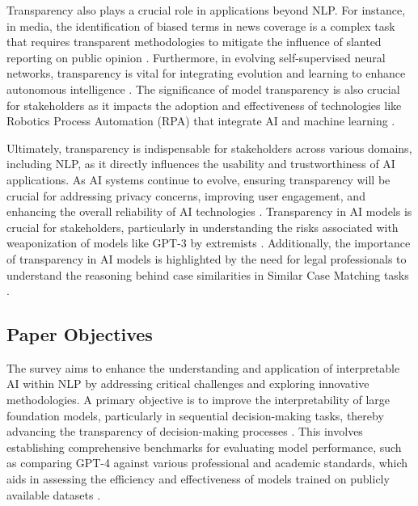 Transparency also plays a crucial role in applications beyond NLP. For instance, in media, the identification of biased terms in news coverage is a complex task that requires transparent methodologies to mitigate the influence of slanted reporting on public opinion \cite{spinde2021identificationbiasedtermsnews}. Furthermore, in evolving self-supervised neural networks, transparency is vital for integrating evolution and learning to enhance autonomous intelligence \cite{le2019evolvingselfsupervisedneuralnetworks}. The significance of model transparency is also crucial for stakeholders as it impacts the adoption and effectiveness of technologies like Robotics Process Automation (RPA) that integrate AI and machine learning \cite{pandy2024advancementsroboticsprocessautomation}.



Ultimately, transparency is indispensable for stakeholders across various domains, including NLP, as it directly influences the usability and trustworthiness of AI applications. As AI systems continue to evolve, ensuring transparency will be crucial for addressing privacy concerns, improving user engagement, and enhancing the overall reliability of AI technologies . Transparency in AI models is crucial for stakeholders, particularly in understanding the risks associated with weaponization of models like GPT-3 by extremists \cite{mcguffie2020radicalizationrisksgpt3advanced}. Additionally, the importance of transparency in AI models is highlighted by the need for legal professionals to understand the reasoning behind case similarities in Similar Case Matching tasks \cite{lin2023interpretabilityframeworksimilarcase}.



\subsection{Paper Objectives} \label{subsec:Paper Objectives}



The survey aims to enhance the understanding and application of interpretable AI within NLP by addressing critical challenges and exploring innovative methodologies. A primary objective is to improve the interpretability of large foundation models, particularly in sequential decision-making tasks, thereby advancing the transparency of decision-making processes \cite{sabanayagam2023unveilinghessiansconnectiondecision}. This involves establishing comprehensive benchmarks for evaluating model performance, such as comparing GPT-4 against various professional and academic standards, which aids in assessing the efficiency and effectiveness of models trained on publicly available datasets \cite{touvron2023llama}.




